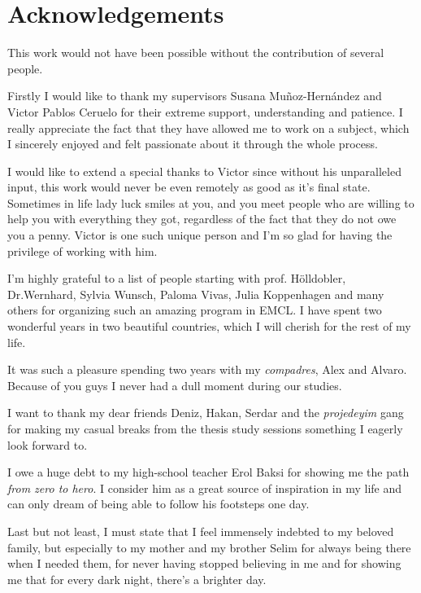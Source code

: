 %

\chapter*{\centering \LARGE{Acknowledgements}}
\label{chap:Acknowledgements}


\small{This work would not have been possible without the contribution of several people.}

\small{Firstly I would like to thank my supervisors Susana Mu\~noz-Hern\'andez and Victor Pablos Ceruelo for their extreme support, understanding and patience. I really appreciate the fact that they have allowed me to work on a subject, which I sincerely enjoyed and felt passionate about it through the whole process. }

\small{I would like to extend a special thanks to Victor since without his unparalleled input, this work would never be even remotely as good as it's final state. Sometimes in life lady luck smiles at you, and you meet people who are willing to help you with everything they got, regardless of the fact that they do not owe you a penny. Victor is one such unique person and I'm so glad for having the privilege of working with him.}

\small{I'm highly grateful to a list of people starting with prof. H\"{o}lldobler, Dr.Wernhard, Sylvia Wunsch, Paloma Vivas, Julia Koppenhagen and many others for organizing such an amazing program in EMCL. I have spent two wonderful years in two beautiful countries, which I will cherish for the rest of my life.}

\small{It was such a pleasure spending two years with my \textit{compadres}, Alex and Alvaro. Because of you guys I never had a dull moment during our studies.}

\small{I want to thank my dear friends Deniz, Hakan, Serdar and the \textit{projedeyim} gang for making my casual breaks from the thesis study sessions something I eagerly look forward to.}

\small{I owe a huge debt to my high-school teacher Erol Baksi for showing me the path \textit{from zero to hero}. I consider him as a great source of inspiration in my life and can only dream of being able to follow his footsteps one day. }

\small{Last but not least, I must state that I feel immensely indebted to my beloved family, but especially to my mother and my brother Selim for always being there when I needed them, for never having stopped believing in me and for showing me that for every dark night, there's a brighter day.}

%